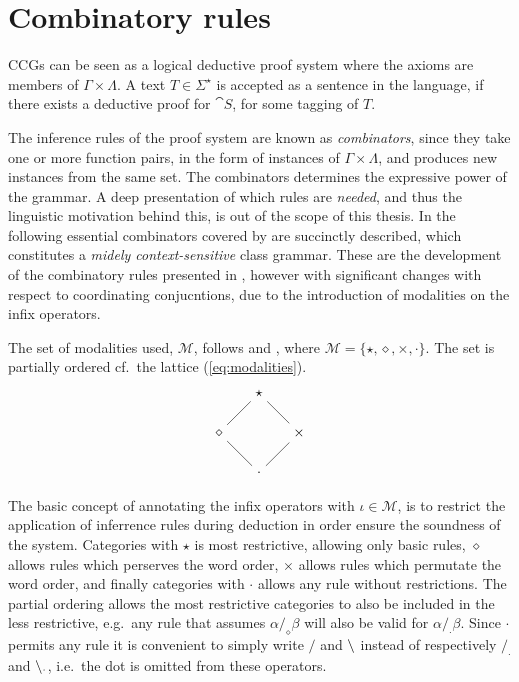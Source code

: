 \section{Combinatory rules}
CCGs can be seen as a logical deductive proof system where the axioms are members of $\Gamma \times \Lambda$. A text $T \in \Sigma^\star$ is accepted as a sentence in the language, if there exists a deductive proof for $\cat{S}$, for some tagging of $T$.

The inference rules of the proof system are known as \emph{combinators}, since they take one or more function pairs, in the form of instances of $\Gamma \times \Lambda$, and produces new instances from the same set. The combinators determines the expressive power of the grammar. A deep presentation of which rules are \emph{needed}, and thus the linguistic motivation behind this, is out of the scope of this thesis. In the following essential combinators covered by \citeauthor{ts}  are succinctly described, which constitutes a \emph{midely context-sensitive} class grammar. These are the development of the combinatory rules \citeauthor{sp} presented in , however with significant changes with respect to coordinating conjucntions, due to the introduction of modalities on the infix operators. 

The set of modalities used, $\mathcal{M}$, follows \cite{multiModalCCG} and \cite{ts}, where $\mathcal{M} = \{ \star, \diamond, \times, \cdot \}$. The set is partially ordered cf.\ the lattice (\ref{eq:modalities}).
\begin{equation}  
  \begin{tikzpicture}
    \tikzstyle{all nodes}=[inner sep=4pt]
    \draw node(*)at(0,1){$\star$}
          node(D)at(-1,0){$\diamond$}                    
          node(X)at(1,0){$\times$}
          node(d)at(0,-1){$\cdot$};
    \draw(*)--(D);
    \draw(*)--(X);
    \draw(D)--(d);
    \draw(X)--(d);
  \end{tikzpicture}
  \label{eq:modalities}
\end{equation}

The basic concept of annotating the infix operators with $\iota \in \mathcal{M}$, is to restrict the application of inferrence rules during deduction in order ensure the soundness of the system. Categories with $\star$ is most restrictive, allowing only basic rules, $\diamond$ allows rules which perserves the word order, $\times$ allows rules which permutate the word order, and finally categories with $\cdot$ allows any rule without restrictions. The partial ordering allows the most restrictive categories to also be included in the less restrictive, e.g.\ any rule that assumes $\alpha /_\diamond \beta$ will also be valid for $\alpha /_\cdot \beta$. Since $\cdot$ permits any rule it is convenient to simply write $/$ and $\backslash$ instead of respectively $/_\cdot$ and $\backslash_\cdot$, i.e.\ the dot is omitted from these operators.

